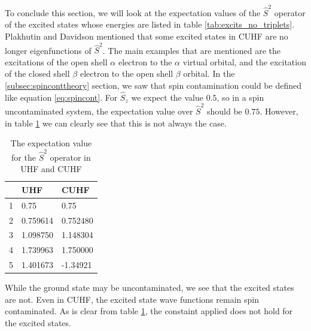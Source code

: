\documentclass[twoside,twocolumn,9pt]{article}
\begin{document}
To conclude this section, we will look at the expectation values of the $\hat{S}^2$ operator of the excited states whose energies are listed in table \ref{tab:excits_no_triplets}.
Plakhutin and Davidson mentioned that some excited states in CUHF are no longer eigenfunctions of $\hat{S}^2$\cite{Plakhutin2014}. The main examples that are mentioned are the
excitations of the open shell $\alpha$ electron to the $\alpha$ virtual orbital, and the excitation of the closed shell $\beta$ electron to the open shell $\beta$ orbital. In the
\ref{subsec:spinconttheory} section, we saw that spin contamination could be defined like equation \eqref{eq:spincont}. For $\hat{S}_z$ we expect the value $0.5$\cite{Acke2019}, so in a
spin uncontaminated system, the expectation value over $\hat{S}^2$ should be $0.75$. However, in table \ref{tab:spincon} we can clearly see that this is not always the case.

\begin{table}[h]
  \caption{The expectation value for the $\hat{S}^2$ operator in UHF and CUHF}
  \label{tab:spincon}
  \begin{tabular}{l|l|l}
      & UHF      & CUHF     \\
    \hline
    1 & 0.75     & 0.75     \\
    2 & 0.759614 & 0.752480 \\
    3 & 1.098750 & 1.148304 \\
    4 & 1.739963 & 1.750000 \\
    5 & 1.401673 & -1.34921
  \end{tabular}
\end{table}
While the ground state may be uncontaminated, we see that the excited states are not. Even in CUHF, the excited state wave functions remain spin contaminated. As is clear from table
\ref{tab:spincon}, the constaint applied does not hold for the excited states.
\end{document}

